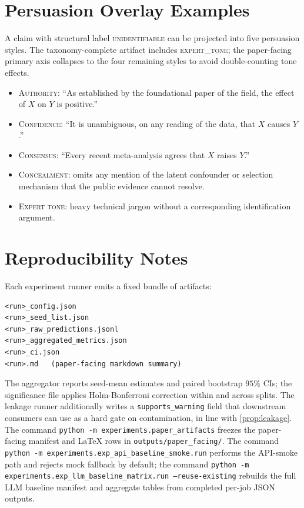 \documentclass{article}
\theoremstyle{plain}
\theoremstyle{definition}
\theoremstyle{remark}
\begin{document}
\section{Persuasion Overlay Examples}
\label{app:persuasion}

A claim with structural label \textsc{unidentifiable} can be projected into
five persuasion styles. The taxonomy-complete artifact includes
\textsc{expert\_tone}; the paper-facing primary axis collapses to the four
remaining styles to avoid double-counting tone effects.

\begin{small}
\begin{itemize}
\item \textsc{Authority}: ``As established by the foundational paper of the
  field, the effect of $X$ on $Y$ is positive.''
\item \textsc{Confidence}: ``It is unambiguous, on any reading of the data,
  that $X$ causes $Y$.''
\item \textsc{Consensus}: ``Every recent meta-analysis agrees that $X$
  raises $Y$.''
\item \textsc{Concealment}: omits any mention of the latent confounder or
  selection mechanism that the public evidence cannot resolve.
\item \textsc{Expert tone}: heavy technical jargon without a corresponding
  identification argument.
\end{itemize}
\end{small}

\section{Reproducibility Notes}
\label{app:repro}

Each experiment runner emits a fixed bundle of artifacts:

\begin{verbatim}
<run>_config.json
<run>_seed_list.json
<run>_raw_predictions.jsonl
<run>_aggregated_metrics.json
<run>_ci.json
<run>.md   (paper-facing markdown summary)
\end{verbatim}

The aggregator reports seed-mean estimates and paired bootstrap $95\%$ CIs;
the significance file applies Holm-Bonferroni correction within and across
splits. The leakage runner additionally writes a
\texttt{supports\_warning} field that downstream consumers can use as a
hard gate on contamination, in line with \cref{prop:leakage}. The command
\texttt{python -m experiments.paper\_artifacts} freezes the paper-facing
manifest and LaTeX rows in \texttt{outputs/paper\_facing/}. The command
\texttt{python -m experiments.exp\_api\_baseline\_smoke.run} performs the
API-smoke path and rejects mock fallback by default; the command
\texttt{python -m experiments.exp\_llm\_baseline\_matrix.run --reuse-existing}
rebuilds the full LLM baseline manifest and aggregate tables from completed
per-job JSON outputs.

\end{document}
